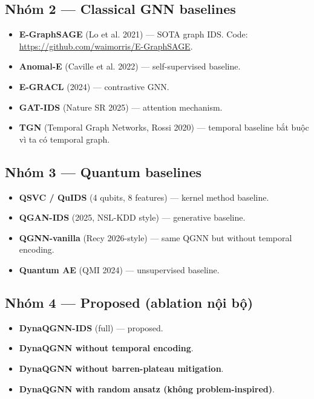 \documentclass[11pt,a4paper]{article}
\begin{document}
\subsection{Nhóm 2 --- Classical GNN baselines}
\begin{itemize}
  \item \textbf{E-GraphSAGE} (Lo et al. 2021) --- SOTA graph IDS. Code: \url{https://github.com/waimorris/E-GraphSAGE}.
  \item \textbf{Anomal-E} (Caville et al. 2022) --- self-supervised baseline.
  \item \textbf{E-GRACL} (2024) --- contrastive GNN.
  \item \textbf{GAT-IDS} (Nature SR 2025) --- attention mechanism.
  \item \textbf{TGN} (Temporal Graph Networks, Rossi 2020) --- temporal baseline bắt buộc vì ta có temporal graph.
\end{itemize}

\subsection{Nhóm 3 --- Quantum baselines}
\begin{itemize}
  \item \textbf{QSVC / QuIDS} (4 qubits, 8 features) --- kernel method baseline.
  \item \textbf{QGAN-IDS} (2025, NSL-KDD style) --- generative baseline.
  \item \textbf{QGNN-vanilla} (Recy 2026-style) --- same QGNN but without temporal encoding.
  \item \textbf{Quantum AE} (QMI 2024) --- unsupervised baseline.
\end{itemize}

\subsection{Nhóm 4 --- Proposed (ablation nội bộ)}
\begin{itemize}
  \item \textbf{DynaQGNN-IDS} (full) --- proposed.
  \item \textbf{DynaQGNN without temporal encoding}.
  \item \textbf{DynaQGNN without barren-plateau mitigation}.
  \item \textbf{DynaQGNN with random ansatz (không problem-inspired)}.
\end{itemize}

\end{document}
